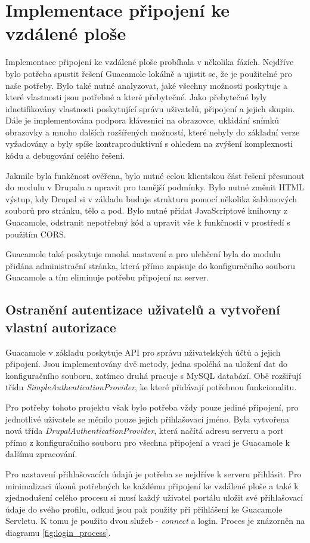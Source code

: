 \chapter{Implementace připojení ke vzdálené ploše}
\label{chap:implementace-guacamole}
Implementace připojení ke vzdálené ploše probíhala v několika fázích. Nejdříve bylo potřeba spustit řešení Guacamole lokálně a ujistit se, že je použitelné pro naše potřeby. Bylo také nutné analyzovat, jaké všechny možnosti poskytuje a které vlastnosti jsou potřebné a které přebytečné. Jako přebytečné byly idnetifikovány vlastnosti poskytující správu uživatelů, připojení a jejich skupin. Dále je implementována podpora klávesnici na obrazovce, ukládání snímků obrazovky a mnoho dalších rozšířených možností, které nebyly do základní verze vyžadovány a byly spíše kontraproduktivní s ohledem na zvýšení komplexnosti kódu a debugování celého řešení. 

Jakmile byla funkčnost ověřena, bylo nutné celou klientskou část řešení přesunout do modulu v Drupalu a upravit pro tamější podmínky. Bylo nutné změnit HTML výstup, kdy Drupal si v základu buduje strukturu pomocí několika šablonových souborů pro stránku, tělo a pod. Bylo nutné přidat JavaScriptové knihovny z Guacamole, odstranit nepotřebný kód a upravit vše k funkčnosti v prostředí s použitím CORS. 

Guacamole také poskytuje mnohá nastavení a pro ulehčení byla do modulu přidána administrační stránka, která přímo zapisuje do konfiguračního souboru Guacamole a tím eliminuje potřebu připojení na server. 

\section{Ostranění autentizace uživatelů a vytvoření vlastní autorizace}
Guacamole v základu poskytuje API pro správu uživatelských účtů a jejich připojení. Jsou implementovány dvě metody, jedna spoléhá na uložení dat do konfiguračního souboru, zatímco druhá pracuje s MySQL databází. Obě rozšiřují třídu \emph{SimpleAuthenticationProvider}, ke které přidávají potřebnou funkcionalitu. 

Pro potřeby tohoto projektu však bylo potřeba vždy pouze jediné připojení, pro jednotlivé uživatele se měnilo pouze jejich přihlašovací jméno. Byla vytvořena nová třída \emph{DrupalAuthenticationProvider}, která načítá adresu serveru a port přímo z konfiguračního souboru pro všechna připojení a vrací je Guacamole k dalšímu zpracování. 

Pro nastavení přihlašovacích údajů je potřeba se nejdříve k serveru přihlásit. Pro minimalizaci úkonů potřebných ke každému připojení ke vzdálené ploše a také k zjednodušení celého procesu si musí každý uživatel portálu uložit své přihlašovací údaje do svého profilu, odkud jsou pak použity při přihlášení ke Guacamole Servletu. K tomu je použito dvou služeb - \emph{connect} a {login}. Proces je znázorněn na diagramu \ref{fig:login_process}. 

